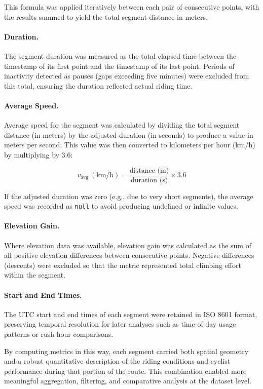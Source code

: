 This formula was applied iteratively between each pair of consecutive points, with the results summed to yield the total segment distance in meters.

\paragraph{Duration.}
The segment duration was measured as the total elapsed time between the timestamp of its first point and the timestamp of its last point. Periods of inactivity detected as pauses (gaps exceeding five minutes) were excluded from this total, ensuring the duration reflected actual riding time.


\paragraph{Average Speed.} 
Average speed for the segment was calculated by dividing the total segment distance (in meters) by the adjusted duration (in seconds) to produce a value in meters per second. This value was then converted to kilometers per hour (km/h) by multiplying by 3.6:

\begin{equation}
v_{\text{avg}} \ (\text{km/h}) = \frac{\text{distance (m)}}{\text{duration (s)}} \times 3.6
\end{equation}

If the adjusted duration was zero (e.g., due to very short segments), the average speed was recorded as \texttt{null} to avoid producing undefined or infinite values.

\paragraph{Elevation Gain.} 
Where elevation data was available, elevation gain was calculated as the sum of all positive elevation differences between consecutive points. Negative differences (descents) were excluded so that the metric represented total climbing effort within the segment.

\paragraph{Start and End Times.} 
The UTC start and end times of each segment were retained in ISO 8601 format, preserving temporal resolution for later analyses such as time-of-day usage patterns or rush-hour comparisons.

By computing metrics in this way, each segment carried both spatial geometry and a robust quantitative description of the riding conditions and cyclist performance during that portion of the route. This combination enabled more meaningful aggregation, filtering, and comparative analysis at the dataset level.

